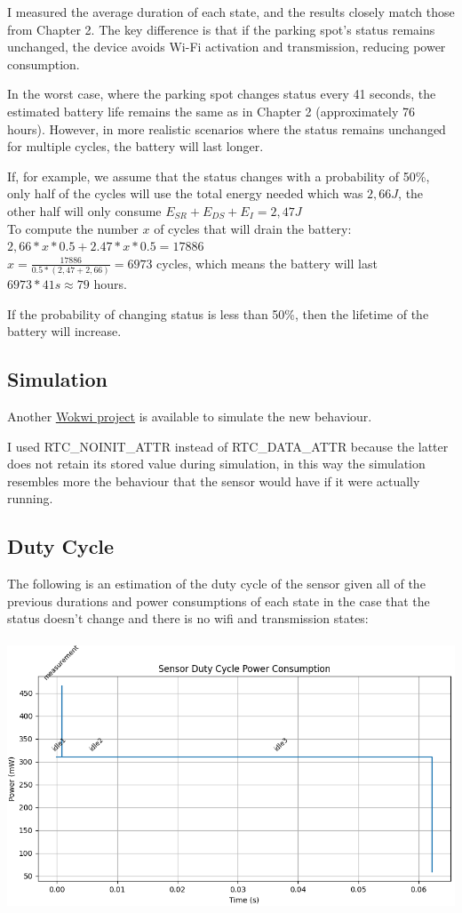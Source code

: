 \documentclass{Configuration_Files/PoliMi3i_thesis}
\begin{document}
I measured the average duration of each state, and the results closely match those from Chapter 2. The key difference is that if the parking spot's status remains unchanged, the device avoids Wi-Fi activation and transmission, reducing power consumption. 

In the worst case, where the parking spot changes status every 41 seconds, the estimated battery life remains the same as in Chapter 2 (approximately 76 hours). However, in more realistic scenarios where the status remains unchanged for multiple cycles, the battery will last longer.

If, for example, we assume that the status changes with a probability of 50\%, only half of the cycles will use the total energy needed which was $2,66J$, the other half will only consume $E_{SR}+E_{DS}+E_I=2,47J$\\
To compute the number $x$ of cycles that will drain the battery:\\
$2,66*x*0.5+2.47*x*0.5=17886$\\
$x = \frac{17886}{0.5*(2,47+2,66)}=6973$ cycles, which means the battery will last $6973*41s\approx 79$ hours.

If the probability of changing status is less than 50\%, then the lifetime of the battery will increase.

\subsection{Simulation}

Another \underline{\href{https://wokwi.com/projects/425676146192933889}{Wokwi project}} is available to simulate the new behaviour.

I used RTC\_NOINIT\_ATTR instead of RTC\_DATA\_ATTR because the latter does not retain its stored value during simulation, in this way the simulation resembles more the behaviour that the sensor would have if it were actually running.

\subsection{Duty Cycle}
The following is an estimation of the duty cycle of the sensor given all of the previous durations and power consumptions of each state in the case that the status doesn't change and there is no wifi and transmission states:\\ \\
\includegraphics[width=\textwidth]{Images/opt_duty_cycle.png}

\cleardoublepage
\end{document}
